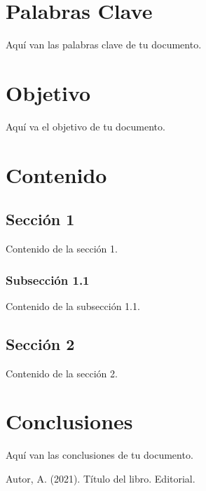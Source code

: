 \documentclass[12pt]{report}
\begin{document}
\chapter*{Palabras Clave}
Aquí van las palabras clave de tu documento.
\newpage

\chapter*{Objetivo}
Aquí va el objetivo de tu documento.
\newpage

\chapter{Contenido}
\section{Sección 1}
Contenido de la sección 1. \cite{1}

\subsection{Subsección 1.1}
Contenido de la subsección 1.1.

\section{Sección 2}
Contenido de la sección 2.
\newpage

\chapter{Conclusiones}
Aquí van las conclusiones de tu documento.
\newpage

\begin{thebibliography}{1}
 Autor, A. (2021). Título del libro. Editorial.
\end{thebibliography}
\end{document}
